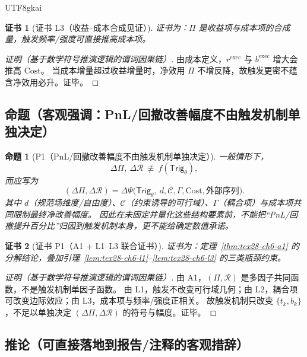 \documentclass[12pt]{article}
\newtheorem{proposition}{命题}[section]
\newtheorem{Certificate}{证书}[section]
\begin{document}
\begin{CJK*}{UTF8}{gkai}
\begin{Certificate}[证书 L3（收益--成本合成见证）]
\label{cert:tex28-ch6-l3}
证书为：$\Pi$ 是收益项与成本项的合成量，触发频率/强度可直接推高成本项。
\end{Certificate}

\begin{proof}[证明（基于数学符号推演逻辑的谓词因果链）]
由成本定义，$r^{\mathrm{exec}}$ 与 $b^{\mathrm{exec}}$ 增大会推高 $\mathrm{Cost}$。
当成本增量超过收益增量时，净效用 $\Pi$ 不增反降，故触发更密不蕴含净效用必升。证毕。
\end{proof}

\subsection{命题（客观强调：PnL/回撤改善幅度不由触发机制单独决定）}
\label{subsec:tex28-ch6-props}

\begin{proposition}[P1（PnL/回撤改善幅度不由触发机制单独决定）]
\label{prop:tex28-ch6-p1}
一般情形下，
\[
  \Delta \Pi,\ \Delta \mathcal{R}\ \not\equiv\ f(\mathsf{Trig}_{\theta}),
\]
而应写为
\[
  (\Delta\Pi,\Delta\mathcal{R})
  =\Delta\Psi\bigl(
  \mathsf{Trig}_{\theta},\ d,\mathcal{C},\Gamma,\mathrm{Cost},\text{外部序列}
  \bigr).
\]
其中 $d$（规范场维度/自由度）、$\mathcal{C}$（约束诱导的可行域）、$\Gamma$（耦合项）与成本项共同限制最终净改善幅度。
因此在未固定并量化这些结构要素前，不能把“PnL/回撤提升百分比”归因到触发机制本身，更不能给确定数值承诺。
\end{proposition}

\begin{Certificate}[证书 P1（A1 + L1--L3 联合证书）]
\label{cert:tex28-ch6-p1}
证书为：定理~\ref{thm:tex28-ch6-a1} 的分解结论，叠加引理~\ref{lem:tex28-ch6-l1}--\ref{lem:tex28-ch6-l3} 的三类瓶颈约束。
\end{Certificate}

\begin{proof}[证明（基于数学符号推演逻辑的谓词因果链）]
由 A1，$(\Pi,\mathcal{R})$ 是多因子共同函数，不是触发机制单因子函数。
由 L1，触发不改变可行域几何；由 L2，耦合项可改变边际效应；由 L3，成本项与频率/强度正相关。
故触发机制只改变 $\{t_k,b_k\}$，不足以单独决定 $(\Delta\Pi,\Delta\mathcal{R})$ 的符号与幅度。证毕。
\end{proof}

\subsection{推论（可直接落地到报告/注释的客观措辞）}
\label{subsec:tex28-ch6-corollaries}


\end{CJK*}
\end{document}
